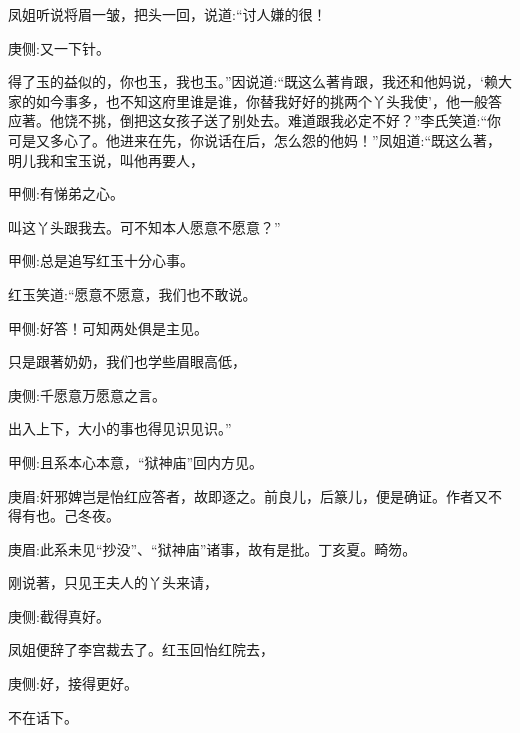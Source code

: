 \begin{parag}
    凤姐听说将眉一皱，把头一回，说道:“讨人嫌的很！\begin{note}庚侧:又一下针。\end{note}得了玉的益似的，你也玉，我也玉。”因说道:“既这么著肯跟，我还和他妈说，‘赖大家的如今事多，也不知这府里谁是谁，你替我好好的挑两个丫头我使’，他一般答应著。他饶不挑，倒把这女孩子送了别处去。难道跟我必定不好？”李氏笑道:“你可是又多心了。他进来在先，你说话在后，怎么怨的他妈！”凤姐道:“既这么著，明儿我和宝玉说，叫他再要人，\begin{note}甲侧:有悌弟之心。\end{note}叫这丫头跟我去。可不知本人愿意不愿意？”\begin{note}甲侧:总是追写红玉十分心事。\end{note}红玉笑道:“愿意不愿意，我们也不敢说。\begin{note}甲侧:好答！可知两处俱是主见。\end{note}只是跟著奶奶，我们也学些眉眼高低，\begin{note}庚侧:千愿意万愿意之言。\end{note}出入上下，大小的事也得见识见识。”\begin{note}甲侧:且系本心本意，“狱神庙”回内方见。\end{note}\begin{note}庚眉:奸邪婢岂是怡红应答者，故即逐之。前良儿，后篆儿，便是确证。作者又不得有也。己冬夜。\end{note}\begin{note}庚眉:此系未见“抄没”、“狱神庙”诸事，故有是批。丁亥夏。畸笏。\end{note}刚说著，只见王夫人的丫头来请，\begin{note}庚侧:截得真好。\end{note}凤姐便辞了李宫裁去了。红玉回怡红院去，\begin{note}庚侧:好，接得更好。\end{note}不在话下。
\end{parag}


